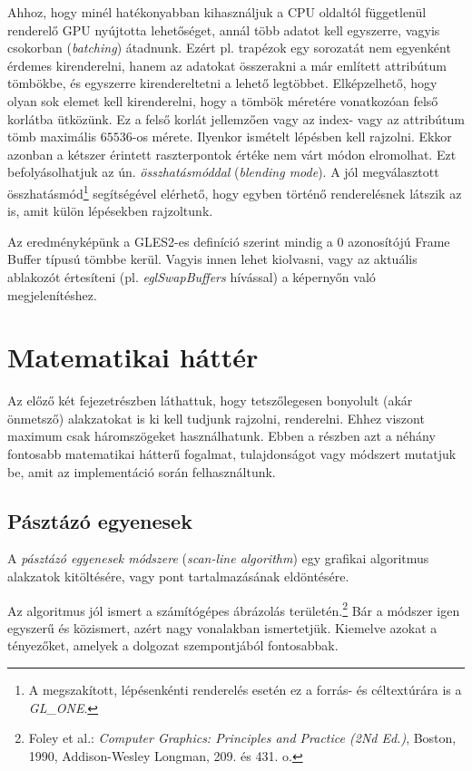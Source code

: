 \documentclass[12pt]{report}
\theoremstyle{definition}
\newcommand{\inenglish}[1]{\textsl{#1}}
\newcommand{\func}[1]{{\textsl{#1}}}
\begin{document}
Ahhoz, hogy minél hatékonyabban kihasználjuk a CPU oldaltól függetlenül
renderelő GPU nyújtotta lehetőséget, annál több adatot kell egyszerre, vagyis
csokorban (\inenglish{batching}) átadnunk. Ezért pl. trapézok egy sorozatát nem
egyenként érdemes kirenderelni, hanem az adatokat összerakni a már említett
attribútum tömbökbe, és egyszerre kirendereltetni a lehető legtöbbet.
Elképzelhető, hogy olyan sok elemet kell kirenderelni, hogy a tömbök méretére
vonatkozóan felső korlátba ütközünk. Ez a felső korlát jellemzően vagy az
index- vagy az attribútum tömb maximális $65536$-os mérete. Ilyenkor ismételt
lépésben kell rajzolni. Ekkor azonban a kétszer érintett raszterpontok értéke
nem várt módon elromolhat. Ezt befolyásolhatjuk az ún. \emph{összhatásmóddal}
(\inenglish{blending mode}). A jól megválasztott összhatásmód\footnote{A
megszakított, lépésenkénti renderelés esetén ez a forrás- és céltextúrára is a
\func{GL\_ONE}.} segítségével elérhető, hogy egyben történő renderelésnek
látszik az is, amit külön lépésekben rajzoltunk.

Az eredményképünk a GLES2-es definíció szerint mindig a $0$ azonosítójú Frame
Buffer típusú tömbbe kerül. Vagyis innen lehet kiolvasni, vagy az aktuális
ablakozót értesíteni (pl. \emph{eglSwapBuffers} hívással) a képernyőn való
megjelenítéshez.

    \section[Matematikai háttér]{Matematikai háttér}
    \label{sec:Matematikai_háttér}

Az előző két fejezetrészben láthattuk, hogy tetszőlegesen bonyolult (akár
önmetsző) alakzatokat is ki kell tudjunk rajzolni, renderelni. Ehhez viszont
maximum csak háromszögeket használhatunk. Ebben a részben azt a néhány fontosabb
matematikai hátterű fogalmat, tulajdonságot vagy módszert mutatjuk be, amit az
implementáció során felhasználtunk.

    \subsection*{Pásztázó egyenesek}
    \label{sec:Pásztázó_egyenesek}

A \emph{pásztázó egyenesek módszere} (\inenglish{scan-line algorithm}) egy
grafikai algoritmus alakzatok kitöltésére, vagy pont tartalmazásának
eldöntésére.

Az algoritmus jól ismert a számítógépes ábrázolás területén.\footnote{Foley et
al.: \emph{Computer Graphics: Principles and Practice (2Nd Ed.)}, Boston, 1990,
Addison-Wesley Longman, 209. és 431. o.} Bár a módszer igen egyszerű és
közismert, azért nagy vonalakban ismertetjük. Kiemelve azokat a tényezőket,
amelyek a dolgozat szempontjából fontosabbak.
\end{document}
